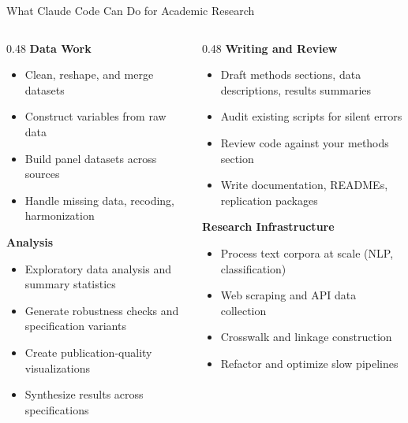 \documentclass[aspectratio=169, 11pt]{beamer}
\begin{document}

\begin{frame}{What Claude Code Can Do for Academic Research}
  \footnotesize
  \begin{columns}[T]
    \begin{column}{0.48\textwidth}
      \textbf{Data Work}
      \begin{itemize}
        \item Clean, reshape, and merge datasets
        \item Construct variables from raw data
        \item Build panel datasets across sources
        \item Handle missing data, recoding, harmonization
      \end{itemize}

      \vspace{0.5em}
      \textbf{Analysis}
      \begin{itemize}
        \item Exploratory data analysis and summary statistics
        \item Generate robustness checks and specification variants
        \item Create publication-quality visualizations
        \item Synthesize results across specifications
      \end{itemize}
    \end{column}
    \begin{column}{0.48\textwidth}
      \textbf{Writing and Review}
      \begin{itemize}
        \item Draft methods sections, data descriptions, results summaries
        \item Audit existing scripts for silent errors
        \item Review code against your methods section
        \item Write documentation, READMEs, replication packages
      \end{itemize}

      \vspace{0.5em}
      \textbf{Research Infrastructure}
      \begin{itemize}
        \item Process text corpora at scale (NLP, classification)
        \item Web scraping and API data collection
        \item Crosswalk and linkage construction
        \item Refactor and optimize slow pipelines
      \end{itemize}
    \end{column}
  \end{columns}
\end{frame}
\end{document}
